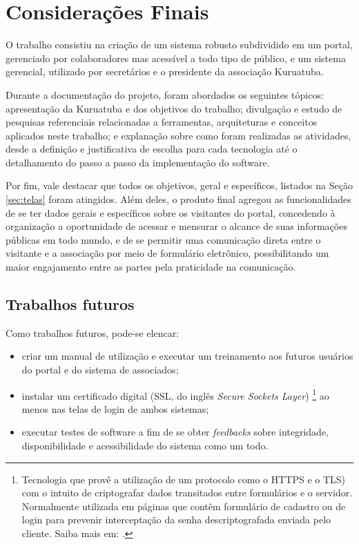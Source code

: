 \chapter{Considerações Finais}

O trabalho consistiu na criação de um sistema robusto subdividido em um portal, gerenciado por colaboradores mas acessível a todo tipo de público, e um sistema gerencial, utilizado por secretários e o presidente da associação Kuruatuba. 

Durante a documentação do projeto, foram abordados os seguintes tópicos: apresentação da Kuruatuba e dos objetivos do trabalho; divulgação e estudo de pesquisas referenciais relacionadas a ferramentas, arquiteturas e conceitos aplicados neste trabalho; e explanação sobre como foram realizadas as atividades, desde a definição e justificativa de escolha para cada tecnologia até o detalhamento do passo a passo da implementação do software.

Por fim, vale destacar que todos os objetivos, geral e específicos, listados na Seção \ref{sec:telas} foram atingidos. Além deles, o produto final agregou as funcionalidades de se ter dados gerais e específicos sobre os visitantes do portal, concedendo à organização a oportunidade de acessar e mensurar o alcance de suas informações públicas em todo mundo, e de se permitir uma comunicação direta entre o visitante e a associação por meio de formulário eletrônico, possibilitando um maior engajamento entre as partes pela praticidade na comunicação. 


\hspace{2.5cm}
\section{Trabalhos futuros}
\hspace{2.5cm}

Como trabalhos futuros, pode-se elencar:

\begin{itemize}
 \item criar um manual de utilização e executar um treinamento aos futuros usuários do portal e do sistema de associados;
 \item instalar um certificado digital (SSL, do inglês \textit{Secure Sockets Layer}) \footnote{Tecnologia que provê a utilização de um protocolo como o HTTPS e o TLS) com o intuito de criptografar dados transitados entre formulários e o servidor. Normalmente utilizada em páginas que contêm formulário de cadastro ou de login para prevenir interceptação da senha descriptografada enviada pelo cliente. Saiba mais em: .} ao menos nas telas de login de ambos sistemas;
 \item executar testes de software a fim de se obter \textit{feedbacks} sobre integridade, disponibilidade e acessibilidade do sistema como um todo.
\end{itemize}


